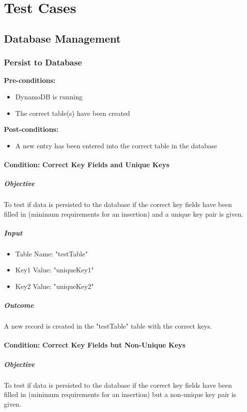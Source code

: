 \documentclass{article}
\begin{document}
\section{Test Cases}
	\subsection{Database Management}
		\subsubsection{Persist to Database}
			\textbf{Pre-conditions:}
			\begin{itemize}
				\item DynamoDB is running
				\item The correct table(s) have been created
			\end{itemize}
			\textbf{Post-conditions:}
			\begin{itemize}
				\item A new entry has been entered into the correct table in the database
			\end{itemize}
			
			\paragraph{Condition: Correct Key Fields and Unique Keys}
				\subparagraph{Objective}
					To test if data is persisted to the database if the correct key fields have been filled in (minimum requirements for an insertion) and a unique key pair is given.
				
				\subparagraph{Input}
					\begin{itemize}
						\item Table Name: "testTable"
						\item Key1 Value: "uniqueKey1"
						\item Key2 Value: "uniqueKey2"
					\end{itemize}
				
				\subparagraph{Outcome}
					A new record is created in the "testTable" table with the correct keys.
			
			\paragraph{Condition: Correct Key Fields but Non-Unique Keys}	
				\subparagraph{Objective}
					To test if data is persisted to the database if the correct key fields have been filled in (minimum requirements for an insertion) but a non-unique key pair is given.
					
\end{document}
